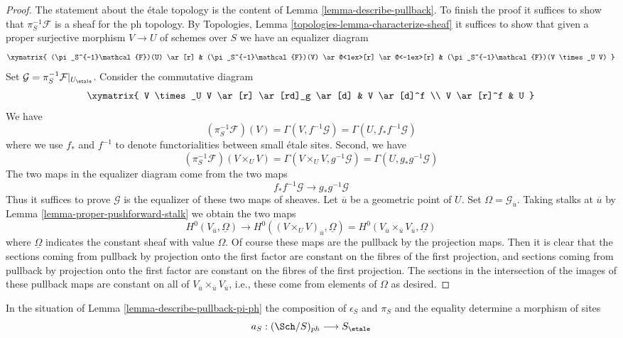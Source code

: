 \begin{proof}
The statement about the \'etale topology is the content
of Lemma \ref{lemma-describe-pullback}. To finish the proof it
suffices to show that $\pi_S^{-1}\mathcal{F}$ is a sheaf for the ph
topology. By Topologies, Lemma \ref{topologies-lemma-characterize-sheaf}
it suffices to show that given a proper surjective morphism
$V \to U$ of schemes over $S$ we have an equalizer diagram
$$
\xymatrix{
(\pi_S^{-1}\mathcal{F})(U) \ar[r] &
(\pi_S^{-1}\mathcal{F})(V) \ar@<1ex>[r] \ar@<-1ex>[r] &
(\pi_S^{-1}\mathcal{F})(V \times_U V)
}
$$
Set $\mathcal{G} = \pi_S^{-1}\mathcal{F}|_{U_\etale}$.
Consider the commutative diagram
$$
\xymatrix{
V \times_U V \ar[r] \ar[rd]_g \ar[d] & V \ar[d]^f \\
V \ar[r]^f & U
}
$$
We have
$$
(\pi_S^{-1}\mathcal{F})(V) = \Gamma(V, f^{-1}\mathcal{G}) =
\Gamma(U, f_*f^{-1}\mathcal{G})
$$
where we use $f_*$ and $f^{-1}$ to denote functorialities between
small \'etale sites. Second, we have
$$
(\pi_S^{-1}\mathcal{F})(V \times_U V) =
\Gamma(V \times_U V, g^{-1}\mathcal{G}) =
\Gamma(U, g_*g^{-1}\mathcal{G})
$$
The two maps in the equalizer diagram come from the two maps
$$
f_*f^{-1}\mathcal{G} \longrightarrow g_*g^{-1}\mathcal{G}
$$
Thus it suffices to prove $\mathcal{G}$ is
the equalizer of these two maps of sheaves.
Let $\overline{u}$ be a geometric point of $U$. Set
$\Omega = \mathcal{G}_{\overline{u}}$.
Taking stalks at $\overline{u}$ by
Lemma \ref{lemma-proper-pushforward-stalk}
we obtain the two maps
$$
H^0(V_{\overline{u}}, \underline{\Omega}) \longrightarrow
H^0((V \times_U V)_{\overline{u}}, \underline{\Omega}) =
H^0(V_{\overline{u}} \times_{\overline{u}} V_{\overline{u}},
\underline{\Omega})
$$
where $\underline{\Omega}$ indicates the constant sheaf with value
$\Omega$. Of course these maps are the pullback by the projection maps.
Then it is clear that the sections coming from pullback
by projection onto the first factor are constant on the fibres of
the first projection, and sections coming from pullback
by projection onto the first factor are constant on the fibres of
the first projection. The sections in the intersection of the images
of these pullback maps are constant on all of
$V_{\overline{u}} \times_{\overline{u}} V_{\overline{u}}$, i.e.,
these come from elements of $\Omega$ as desired.
\end{proof}

\noindent
In the situation of Lemma \ref{lemma-describe-pullback-pi-ph}
the composition of $\epsilon_S$ and $\pi_S$ and the equality
determine a morphism of sites
$$
a_S : (\Sch/S)_{ph} \longrightarrow S_\etale
$$


